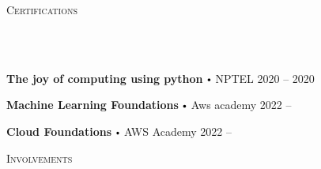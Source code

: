 \documentclass{article}
\newcommand{\lineunder}{
        \vspace*{-8pt} \\ \hspace*{-18pt} 
        \hrulefill \\
        }
\newcommand{\header}[1]{{
        \hspace*{-15pt}\vspace*{6pt} \textsc{#1}} \vspace*{-6pt} 
        \lineunder
        }
\renewcommand{\labelitemi}{
        $\vcenter{\hbox{\tiny$\bullet$}}$\hspace*{3pt}
        }
\renewcommand{\labelitemii}{
        $\vcenter{\hbox{\tiny$\bullet$}}$\hspace*{-3pt}
        }
\newenvironment{bullet-list-major}{
          \begin{list}{\labelitemii}{\setlength\leftmargin{3pt} 
          \topsep 0pt \itemsep -2pt}}{\vspace*{4pt}\end{list}
          }
\begin{document}
      \vspace*{4pt}%
      \header{Certifications}
      {
        \begin{bullet-list-major}
        \item \textbf{The joy of computing using python} \labelitemi NPTEL \hfill 2020 -- 2020
        \end{bullet-list-major}
        

        \begin{bullet-list-major}
        \item \textbf{Machine Learning Foundations} \labelitemi Aws academy \hfill 2022 -- 
        \end{bullet-list-major}
        

        \begin{bullet-list-major}
        \item \textbf{Cloud Foundations} \labelitemi AWS Academy \hfill 2022 -- 
        \end{bullet-list-major}
        }
      \vspace*{4pt}%
      \header{Involvements}
\end{document}
